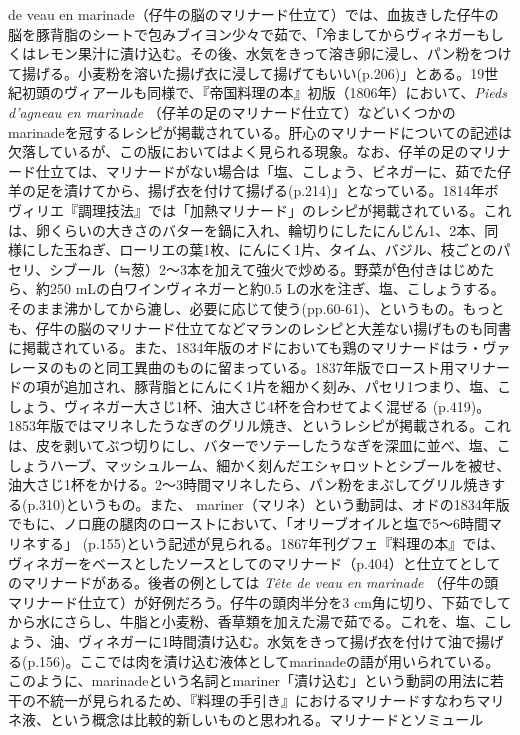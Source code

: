 \begin{main}
{{{{{  de veau en
  marinade}（仔牛の脳のマリナード仕立て）では、血抜きした仔牛の脳を豚背脂のシートで包みブイヨン少々で茹で、「冷ましてからヴィネガーもしくはレモン果汁に漬け込む。その後、水気をきって溶き卵に浸し、パン粉をつけて揚げる。小麦粉を溶いた揚げ衣に浸して揚げてもいい(p.206)」とある。19世紀初頭のヴィアールも同様で、『帝国料理の本』初版（1806年）において、\emph{Pieds
  d'agneau en marinade} （仔羊の足のマリナード仕立て）などいくつかの
  marinadeを冠するレシピが掲載されている。肝心のマリナードについての記述は欠落しているが、この版においてはよく見られる現象。なお、仔羊の足のマリナード仕立ては、マリナードがない場合は「塩、こしょう、ビネガーに、茹でた仔羊の足を漬けてから、揚げ衣を付けて揚げる(p.214)」となっている。1814年ボヴィリエ『調理技法』では「加熱マリナード」のレシピが掲載されている。これは、卵くらいの大きさのバターを鍋に入れ、輪切りにしたにんじん1、2本、同様にした玉ねぎ、ローリエの葉1枚、にんにく1片、タイム、バジル、枝ごとのパセリ、シブール（≒葱）2〜3本を加えて強火で炒める。野菜が色付きはじめたら、約250
  mLの白ワインヴィネガーと約0.5
  Lの水を注ぎ、塩、こしょうする。そのまま沸かしてから漉し、必要に応じて使う(pp.60-61)、というもの。もっとも、仔牛の脳のマリナード仕立てなどマランのレシピと大差ない揚げものも同書に掲載されている。また、1834年版のオドにおいても鶏のマリナードはラ・ヴァレーヌのものと同工異曲のものに留まっている。1837年版でロースト用マリナードの項が追加され、豚背脂とにんにく1片を細かく刻み、パセリ1つまり、塩、こしょう、ヴィネガー大さじ1杯、油大さじ4杯を合わせてよく混ぜる
  (p.419)。1853年版ではマリネしたうなぎのグリル焼き、というレシピが掲載される。これは、皮を剥いてぶつ切りにし、バターでソテーしたうなぎを深皿に並べ、塩、こしょうハーブ、マッシュルーム、細かく刻んだエシャロットとシブールを被せ、油大さじ1杯をかける。2〜3時間マリネしたら、パン粉をまぶしてグリル焼きする(p.310)というもの。また、
  mariner（マリネ）という動詞は、オドの1834年版でもに、ノロ鹿の腿肉のローストにおいて、「オリーブオイルと塩で5〜6時間マリネする」
  (p.155)という記述が見られる。1867年刊グフェ『料理の本』では、ヴィネガーをベースとしたソースとしてのマリナード（p.404）と仕立てとしてのマリナードがある。後者の例としては
  \emph{Tête de veau en marinade}
  （仔牛の頭　マリナード仕立て）が好例だろう。仔牛の頭肉半分を3
  cm角に切り、下茹でしてから水にさらし、牛脂と小麦粉、香草類を加えた湯で茹でる。これを、塩、こしょう、油、ヴィネガーに1時間漬け込む。水気をきって揚げ衣を付けて油で揚げる(p.156)。ここでは肉を漬け込む液体としてmarinadeの語が用いられている。このように、marinadeという名詞とmariner「漬け込む」という動詞の用法に若干の不統一が見られるため、『料理の手引き』におけるマリナードすなわちマリネ液、という概念は比較的新しいものと思われる。}}{マリナードとソミュール}}\label{marinades-et-saumures}}


\end{main}
